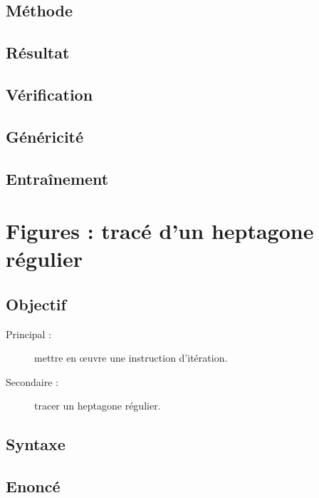 \subsection{Méthode}\label{boucles:nombres:methode}

\subsection{Résultat}\label{boucles:nombres:resultat}

\subsection{Vérification}\label{boucles:nombres:verification}

\subsection{Généricité}\label{boucles:nombres:genericite}

\subsection{Entraînement}\label{boucles:nombres:entrainement}

\section{Figures : tracé d'un heptagone régulier}\label{boucles:figures}

\subsection{Objectif}\label{boucles:figures:objectif}
\begin{description}
\item[Principal : ] mettre en \oe uvre une instruction d'itération.
\item[Secondaire :] tracer un heptagone régulier.
\end{description}

\subsection{Syntaxe \python}\label{boucles:figures:python}

\subsection{Enoncé}\label{boucles:figures:enonce}

